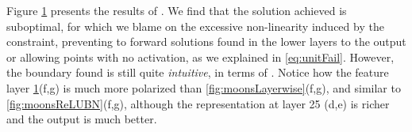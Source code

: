 \begin{figure}
{{    %
    }
    \parbox{.195\textwidth}{%
    }
  }
  \caption{\SepUnit}
    \label{fig:moonsUnitwise}
\end{figure}


Figure \ref{fig:moonsUnitwise} presents the results of \SepUnit. We find that the solution achieved is suboptimal, for which we blame on the excessive non-linearity induced by the constraint, preventing to forward solutions found in the lower layers to the output or allowing points with no activation, as we explained in \ref{eq:unitFail}. However, the boundary found is still quite \emph{intuitive}, in terms of \cite{hauserAsok}. Notice how the feature layer \ref{fig:moonsUnitwise}(f,g) is much more polarized than \SepLayer \ref{fig:moonsLayerwise}(f,g), and similar to \ReLUBN \ref{fig:moonsReLUBN}(f,g), although the representation at layer 25 (d,e) is richer and the output is much better.

